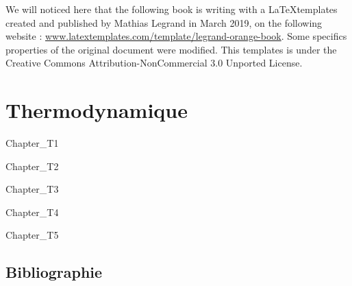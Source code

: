 \documentclass[11pt,fleqn]{book} %
\begin{document}
\noindent We will noticed here that the following book is writing with a \LaTeX  templates created and published by Mathias Legrand in March 2019, on the following website : \url{www.latextemplates.com/template/legrand-orange-book}. Some specifics properties of the original document were modified. This templates is under the Creative Commons Attribution-NonCommercial 3.0 Unported License.




\pagestyle{empty} %

\tableofcontents %

\cleardoublepage %

\pagestyle{fancy} %




\part{Thermodynamique}

{Chapter_T1}


{Chapter_T2}


{Chapter_T3}


{Chapter_T4}


{Chapter_T5}



\chapter*{Bibliographie}
\end{document}
